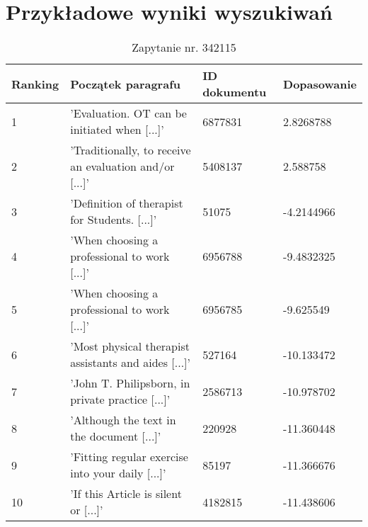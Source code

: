 \section{Przykładowe wyniki wyszukiwań}


\begin{table}[htp!]
\centering
\caption{Zapytanie nr. 342115}
\vspace*{5mm}
\begin{tabular}{llll}
   Ranking & Początek paragrafu & ID dokumentu & Dopasowanie \\
   \hline
    1 & 'Evaluation. OT can be initiated when [...]' & 6877831 & 2.8268788 \\
    2 & 'Traditionally, to receive an evaluation and/or [...]' & 5408137 &  2.588758\\
    3 & 'Definition of therapist for Students. [...]' & 51075 & -4.2144966 \\
    4 & 'When choosing a professional to work [...]' & 6956788 & -9.4832325 \\
    5 & 'When choosing a professional to work [...]' & 6956785 &  -9.625549\\
    6 & 'Most physical therapist assistants and aides [...]' & 527164 &   -10.133472\\
    7 & 'John T. Philipsborn, in private practice [...]' & 2586713 & -10.978702 \\
    8 & 'Although the text in the document [...]' & 220928 &  -11.360448\\
    9 & 'Fitting regular exercise into your daily [...]' & 85197 &  -11.366676\\
    10 & 'If this Article is silent or [...]' & 4182815 &  -11.438606\\

\end{tabular}
\end{table}

